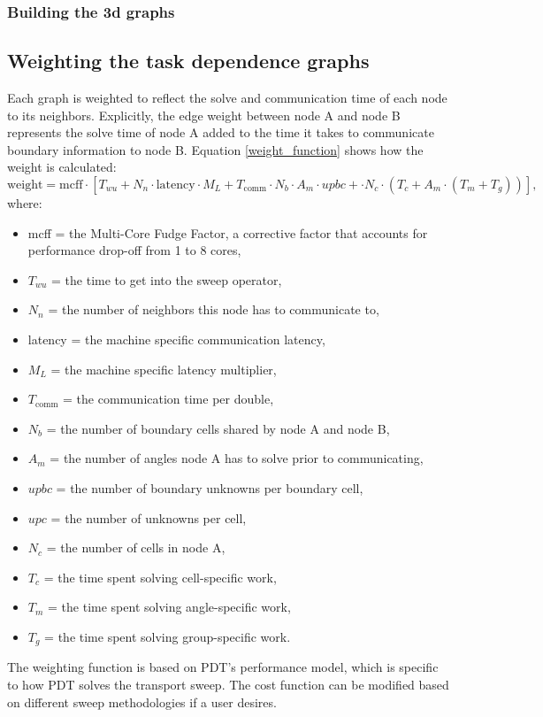 \subsubsection{Building the 3d graphs}


\subsection{Weighting the task dependence graphs}

Each graph is weighted to reflect the solve and communication time of each node to its neighbors. Explicitly, the edge weight between node A and node B represents the solve time of node A added to the time it takes to communicate boundary information to node B. Equation \ref{weight_function} shows how the weight is calculated:
\begin{equation}
\text{weight} = \text{mcff}\cdot [T_{wu} + N_n\cdot \text{latency}\cdot M_L + T_{\text{comm}}\cdot N_b\cdot A_m\cdot upbc + \cdot N_c\cdot (T_c + A_m\cdot (T_m + T_g))],
\label{weight_function}
\end{equation}
where:
\begin{itemize}
  \item mcff = the Multi-Core Fudge Factor, a corrective factor that accounts for performance drop-off from 1 to 8 cores,
  \item $T_{wu}$ = the time to get into the sweep operator,
  \item $N_n$ = the number of neighbors this node has to communicate to,
  \item latency = the machine specific communication latency,
  \item $M_L$ = the machine specific latency multiplier,
  \item $T_{\text{comm}}$ = the communication time per double,
  \item $N_b$ = the number of boundary cells shared by node A and node B,
  \item $A_m$ = the number of angles node A has to solve prior to communicating,
  \item $upbc$ = the number of boundary unknowns per boundary cell,
  \item $upc$ = the number of unknowns per cell,
  \item $N_c$ = the number of cells in node A,
  \item $T_c$ = the time spent solving cell-specific work,
  \item $T_m$ = the time spent solving angle-specific work,
  \item $T_g$ = the time spent solving group-specific work.
\end{itemize}
The weighting function is based on PDT's performance model\cite{mpadams15}, which is specific to how PDT solves the transport sweep. The cost function can be modified based on different sweep methodologies if a user desires.

